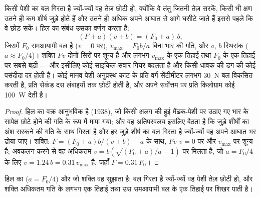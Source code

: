 \begin{theorem}[किसी पेशी का बल, गति और शक्ति]\label{thm:b2:muscle-movement:hill}
किसी पेशी का बल गिरता है ज्यों-ज्यों वह तेज़ छोटी हो, क्योंकि वे तंतु
जितनी तेज़ सरकें, किसी भी क्षण उतने ही कम शीर्ष जुड़े होते हैं
और उतने ही अधिक अपने आघात से आगे घसीटे जाते हैं इससे पहले कि वे छोड़
सकें। हिल का संबंध उसका वर्णन करता है:
\[
(F + a)(v + b) = (F_0 + a)\,b,
\]
जिसमें $F_0$ समआयामी बल है ($v = 0$ पर), $v_{\max} =
F_0 b/a$ बिना भार की गति, और $a$, $b$ स्थिरांक ($a \approx
F_0/4$)। शक्ति $Fv$ दोनों सिरों पर शून्य है और लगभग
$v_{\max}$ के एक तिहाई तथा $F_0$ के एक तिहाई पर सबसे बड़ी --- और इसीलिए कोई साइकिल-सवार
गियर बदलता है और किसी धावक की डग की कोई पसंदीदा दर होती है। कोई मानव
पेशी अनुप्रस्थ काट के प्रति वर्ग सेंटीमीटर लगभग \qty{30}{N} बल
विकसित करती है, प्रति सेकंड दस लंबाइयों तक छोटी होती है, और अपने सर्वोत्तम पर
प्रति किलोग्राम कोई \qty{100}{W} देती है।
\end{theorem}
\begin{proof}
हिल का वक्र आनुभविक है (1938), जो किसी अलग की हुई मेंढक-पेशी पर
उठाए गए भार के सापेक्ष छोटे होने की गति के रूप में मापा गया; और वह अतिपरवलय
इसलिए बैठता है कि जुड़े शीर्षों का अंश सरकने की गति के साथ गिरता है
और हर जुड़े शीर्ष का बल गिरता है ज्यों-ज्यों वह अपने आघात भर
ढोया जाए। शक्ति: $F = (F_0 + a)b/(v + b) - a$ के साथ, $Fv$
$v = 0$ पर और $v_{\max}$ पर शून्य है; अवकलन करने से वह अधिकतम
$v = b(\sqrt{(F_0 + a)/a} - 1)$ पर मिलता है, जो $a = F_0/4$ के लिए $v =
1.24\,b = 0.31\,v_{\max}$ है, जहाँ $F = 0.31\,F_0$।
\end{proof}

\begin{omfigure}

{\small हिल का  ($a = F_0/4$) और जो शक्ति वह
सुझाता है: बल गिरता है ज्यों-ज्यों वह पेशी तेज़ छोटी हो, और शक्ति
अधिकतम गति के लगभग एक तिहाई तथा उस समआयामी बल के एक तिहाई पर शिखर पाती है।}
\end{omfigure}

